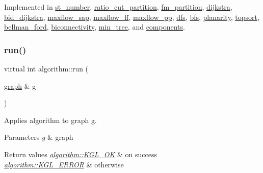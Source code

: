 Implemented in \mbox{\hyperlink{classst__number_ae6f86706b8ae3495d3794b8c684fff0f}{st\+\_\+number}}, \mbox{\hyperlink{classratio__cut__partition_ad017eaf98f9ae4ca9dbe6b3eda9fc94d}{ratio\+\_\+cut\+\_\+partition}}, \mbox{\hyperlink{classfm__partition_a6db2eeb6ae968dbab78302f0448c0ced}{fm\+\_\+partition}}, \mbox{\hyperlink{classdijkstra_a444c288b3a49ec1c2973459dad55ffb3}{dijkstra}}, \mbox{\hyperlink{classbid__dijkstra_a6df2769941bc73fc5626b084745a2258}{bid\+\_\+dijkstra}}, \mbox{\hyperlink{classmaxflow__sap_a14574d2f9ce31a3cdeb0888e57fc0616}{maxflow\+\_\+sap}}, \mbox{\hyperlink{classmaxflow__ff_a893e5136d4f7f1d4b67ef5b67306d17b}{maxflow\+\_\+ff}}, \mbox{\hyperlink{classmaxflow__pp_a2179764baf624f1414211f3a7181b1a0}{maxflow\+\_\+pp}}, \mbox{\hyperlink{classdfs_affaffda8be8418d6dbf396c5b1d6b81a}{dfs}}, \mbox{\hyperlink{classbfs_a6398bc230f9723cd5fdd32cd603647cc}{bfs}}, \mbox{\hyperlink{classplanarity_aca500e3d46a99c6231aff86afa2a71b1}{planarity}}, \mbox{\hyperlink{classtopsort_af93d2f617ceae83ee2a4f9106fbc32c3}{topsort}}, \mbox{\hyperlink{classbellman__ford_a7d28afa62ce8068c4d0f2d1f96136fd6}{bellman\+\_\+ford}}, \mbox{\hyperlink{classbiconnectivity_a4393dd1e626887472f6967722349abc6}{biconnectivity}}, \mbox{\hyperlink{classmin__tree_a0edbe612424dc5f4de4701b8fd0df931}{min\+\_\+tree}}, and \mbox{\hyperlink{classcomponents_a07b6bab5962524ae26ccb478b35cd76c}{components}}.

\mbox{\label{classalgorithm_a734b189509a8d6b56b65f8ff772d43ca}} 
\subsubsection{\texorpdfstring{run()}{run()}}
{\footnotesize\ttfamily virtual int algorithm\+::run (\begin{DoxyParamCaption}\item[{\mbox{\hyperlink{classgraph}{graph}} \&}]{g }\end{DoxyParamCaption})\hspace{0.3cm}{\ttfamily [pure virtual]}}



Applies algorithm to graph g. 


\begin{DoxyParams}{Parameters}
{\em g} & graph \\
\hline
\end{DoxyParams}

\begin{DoxyRetVals}{Return values}
{\em \mbox{\hyperlink{classalgorithm_af1a0078e153aa99c24f9bdf0d97f6710aae4c1cd7fe8d8cf4b143241a6e7c31cf}{algorithm\+::\+K\+G\+L\+\_\+\+OK}}} & on success \\
\hline
{\em \mbox{\hyperlink{classalgorithm_af1a0078e153aa99c24f9bdf0d97f6710ae67bf27b2ef31f73e545a7f9f4a69556}{algorithm\+::\+K\+G\+L\+\_\+\+E\+R\+R\+OR}}} & otherwise \\
\hline
\end{DoxyRetVals}


